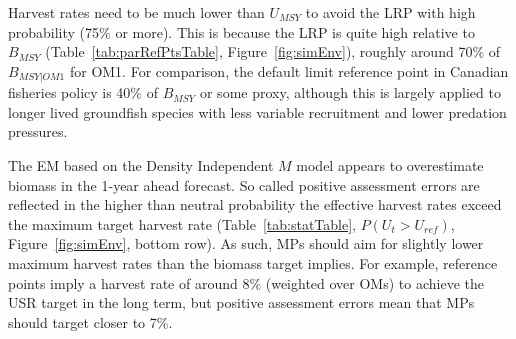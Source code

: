 \documentclass[11pt]{book}
\begin{document}
Harvest rates need to be much lower than \(U_{MSY}\) to avoid the LRP with high probability (75\% or more). This is because the LRP is quite high relative to \(B_{MSY}\) (Table~\ref{tab:parRefPtsTable}, Figure~\ref{fig:simEnv}), roughly around 70\% of \(B_{MSY \vert OM1}\) for OM1. For comparison, the default limit reference point in Canadian fisheries policy is 40\% of \(B_{MSY}\) or some proxy, although this is largely applied to longer lived groundfish species with less variable recruitment and lower predation pressures.

The EM based on the Density Independent \(M\) model appears to overestimate biomass in the 1-year ahead forecast. So called positive assessment errors are reflected in the higher than neutral probability the effective harvest rates exceed the maximum target harvest rate (Table~\ref{tab:statTable}, \(P(U_t > U_{ref})\), Figure~\ref{fig:simEnv}, bottom row). As such, MPs should aim for slightly lower maximum harvest rates than the biomass target implies. For example, reference points imply a harvest rate of around 8\% (weighted over OMs) to achieve the USR target in the long term, but positive assessment errors mean that MPs should target closer to 7\%.
\end{document}
